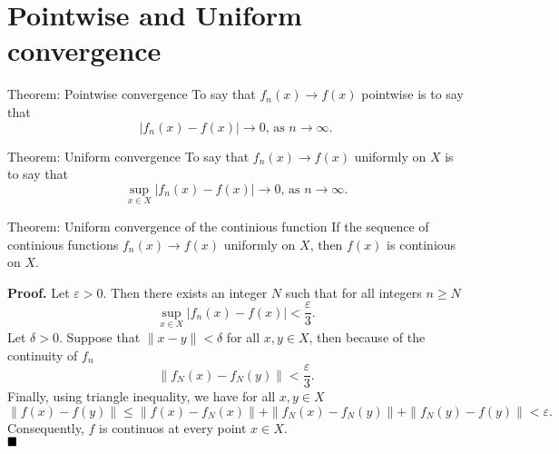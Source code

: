 \documentclass[10pt]{beamer}
\renewcommand{\qed}{\hfill\blacksquare}
\begin{document}
\section{Pointwise and Uniform convergence}
\begin{frame}
	\begin{block}{Theorem: Pointwise convergence}
		To say that \(f_n(x) \rightarrow f(x)\) pointwise is to say that
		\[|f_n(x) - f(x)| \rightarrow 0 \text{, as } n \rightarrow \infty.\]
	\end{block}

	\begin{block}{Theorem: Uniform convergence}
		To say that \(f_n(x) \rightarrow f(x)\) uniformly on \(X\) is to say that
		\[\sup_{x \in X}|f_n(x) - f(x)| \rightarrow 0 \text{, as } n \rightarrow \infty.\]
	\end{block}
\end{frame}

\begin{frame}
	\begin{block}{Theorem: Uniform convergence of the continious function}
		If the sequence of continious functions \(f_n(x) \rightarrow f(x)\) uniformly on \(X\),
		then \(f(x)\) is continious on \(X\).
	\end{block}

	\textbf{Proof.} Let \(\varepsilon > 0\). Then there exists an integer \(N\) such that
	for all integers \(n \ge N\)
	\[\sup_{x \in X}|f_n(x) - f(x)| < \frac{\varepsilon}{3}.\]
	Let \(\delta > 0\). Suppose that \(\|x - y\| < \delta\) for all \(x, y \in X\), then because of the continuity of \(f_n\)
	\[\|f_N(x) - f_N(y)\| < \frac{\varepsilon}{3}.\]
	Finally, using triangle inequality, we have for all \(x, y \in X\)
	\[\|f(x) - f(y)\| \le \|f(x) - f_N(x)\| + \|f_N(x) - f_N(y)\| + \|f_N(y) - f(y)\| < \varepsilon.\]
	Consequently, \(f\) is continuos at every point \(x \in X\). \\ \(\qed\)
\end{frame}
\end{document}
